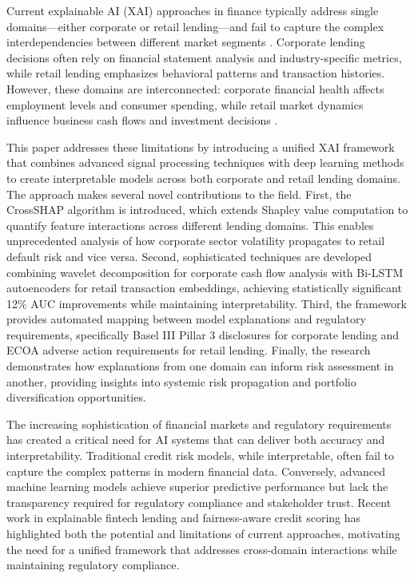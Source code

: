 \documentclass[a4paper,11pt,twoside]{article}
\newcommand{\0}{\Bf{0}}
\theoremstyle{definition}
\begin{document}
Current explainable AI (XAI) approaches in finance typically address single domains—either corporate or retail lending—and fail to capture the complex interdependencies between different market segments \cite{ref3}. Corporate lending decisions often rely on financial statement analysis and industry-specific metrics, while retail lending emphasizes behavioral patterns and transaction histories. However, these domains are interconnected: corporate financial health affects employment levels and consumer spending, while retail market dynamics influence business cash flows and investment decisions \cite{ref4}.

This paper addresses these limitations by introducing a unified XAI framework that combines advanced signal processing techniques with deep learning methods to create interpretable models across both corporate and retail lending domains. The approach makes several novel contributions to the field. First, the CrossSHAP algorithm is introduced, which extends Shapley value computation to quantify feature interactions across different lending domains. This enables unprecedented analysis of how corporate sector volatility propagates to retail default risk and vice versa. Second, sophisticated techniques are developed combining wavelet decomposition for corporate cash flow analysis with Bi-LSTM autoencoders for retail transaction embeddings, achieving statistically significant 12\% AUC improvements while maintaining interpretability. Third, the framework provides automated mapping between model explanations and regulatory requirements, specifically Basel III Pillar 3 disclosures for corporate lending and ECOA adverse action requirements for retail lending. Finally, the research demonstrates how explanations from one domain can inform risk assessment in another, providing insights into systemic risk propagation and portfolio diversification opportunities.

The increasing sophistication of financial markets and regulatory requirements has created a critical need for AI systems that can deliver both accuracy and interpretability. Traditional credit risk models, while interpretable, often fail to capture the complex patterns in modern financial data. Conversely, advanced machine learning models achieve superior predictive performance but lack the transparency required for regulatory compliance and stakeholder trust. Recent work in explainable fintech lending and fairness-aware credit scoring has highlighted both the potential and limitations of current approaches, motivating the need for a unified framework that addresses cross-domain interactions while maintaining regulatory compliance.
\end{document}
